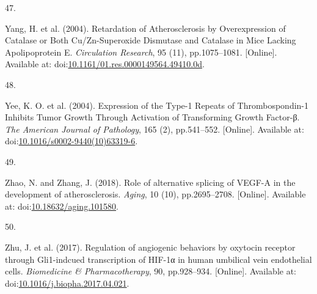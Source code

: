 \documentclass[
  11pt,
]{article}
\newlength{\cslhangindent}
\newlength{\csllabelwidth}
\newlength{\cslentryspacingunit} %
\newenvironment{CSLReferences}[2] %
 {%
  \setlength{\parindent}{0pt}
  \ifodd #1
  \let\oldpar\par
  \def\par{\hangindent=\cslhangindent\oldpar}
  \fi
  \setlength{\parskip}{#2\cslentryspacingunit}
 }%
 {}
\newcommand{\CSLLeftMargin}[1]{\parbox[t]{\csllabelwidth}{#1}}
\newcommand{\CSLRightInline}[1]{\parbox[t]{\linewidth - \csllabelwidth}{#1}\break}
\begin{document}
\begin{CSLReferences}{0}{0}
\leavevmode{}%
\CSLLeftMargin{47. }
\CSLRightInline{Yang, H. {et al.} (2004). {Retardation of Atherosclerosis by Overexpression of Catalase or Both Cu/Zn-Superoxide Dismutase and Catalase in Mice Lacking Apolipoprotein E}. \emph{Circulation Research}, 95 (11), pp.1075--1081. {[}Online{]}. Available at: doi:\href{https://doi.org/10.1161/01.res.0000149564.49410.0d}{10.1161/01.res.0000149564.49410.0d}.}

\leavevmode{}%
\CSLLeftMargin{48. }
\CSLRightInline{Yee, K. O. {et al.} (2004). {Expression of the Type-1 Repeats of Thrombospondin-1 Inhibits Tumor Growth Through Activation of Transforming Growth Factor-β}. \emph{The American Journal of Pathology}, 165 (2), pp.541--552. {[}Online{]}. Available at: doi:\href{https://doi.org/10.1016/s0002-9440(10)63319-6}{10.1016/s0002-9440(10)63319-6}.}

\leavevmode{}%
\CSLLeftMargin{49. }
\CSLRightInline{Zhao, N. and Zhang, J. (2018). {Role of alternative splicing of VEGF-A in the development of atherosclerosis}. \emph{Aging}, 10 (10), pp.2695--2708. {[}Online{]}. Available at: doi:\href{https://doi.org/10.18632/aging.101580}{10.18632/aging.101580}.}

\leavevmode{}%
\CSLLeftMargin{50. }
\CSLRightInline{Zhu, J. {et al.} (2017). {Regulation of angiogenic behaviors by oxytocin receptor through Gli1-indcued transcription of HIF-1α in human umbilical vein endothelial cells}. \emph{Biomedicine \& Pharmacotherapy}, 90, pp.928--934. {[}Online{]}. Available at: doi:\href{https://doi.org/10.1016/j.biopha.2017.04.021}{10.1016/j.biopha.2017.04.021}.}

\end{CSLReferences}
\end{document}
